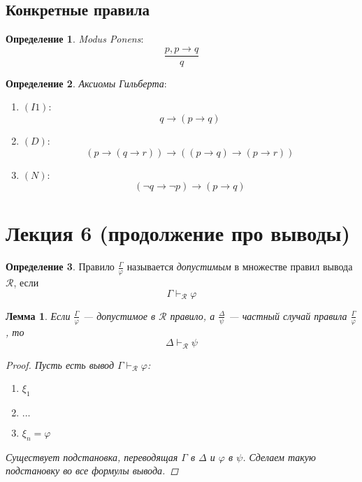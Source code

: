\documentclass[12pt]{article}
\let\im\rightarrow
\let\n\neg
\theoremstyle{definition}
\newtheorem{definition}{Определение}[section]
\theoremstyle{plain}
\newtheorem{lemma}{Лемма}[section]
\theoremstyle{remark}
\begin{document}
\subsection{Конкретные правила}

\begin{definition}
  \textit{Modus Ponens}:
  \[
    \frac{p, p \im q}{q}
  \]
\end{definition}

\begin{definition}
  \textit{Аксиомы Гильберта}:
  \begin{enumerate}
    \item $(I1)$:
      \[
        q \im (p \im q)
      \]

    \item $(D)$:
      \[
        (p \im (q \im r)) \im ((p \im q) \im (p \im r))
      \]

    \item $(N)$:
      \[
        (\n q \im \n p) \im (p \im q)
      \]
  \end{enumerate}
\end{definition}

\pagebreak

\section{Лекция 6 (продолжение про выводы)}

\begin{definition}
  Правило $\frac{\Gamma}{\varphi}$ называется \textit{допустимым} в
  множестве правил вывода $\mathcal{R}$, если
  \begin{displaymath}
    \Gamma \vdash_{\mathcal{R}} \varphi
  \end{displaymath}
\end{definition}

\begin{lemma}
  Если $\frac{\Gamma}{\varphi}$ --- допустимое в $\mathcal{R}$
  правило, а $\frac{\Delta}{\psi}$ --- частный случай правила
  $\frac{\Gamma}{\varphi}$, то
  \begin{displaymath}
    \Delta \vdash_{\mathcal{R}} \psi
  \end{displaymath}
  \begin{proof}
    Пусть есть вывод $\Gamma \vdash_{\mathcal{R}} \varphi$:
    \begin{enumerate}
      \item $\xi_1$

      \item $\dots$

      \item $\xi_n = \varphi$
    \end{enumerate}
    Существует подстановка, переводящая $\Gamma$ в $\Delta$ и
    $\varphi$ в $\psi$. Сделаем такую подстановку во все формулы вывода.
  \end{proof}
\end{lemma}
\end{document}
